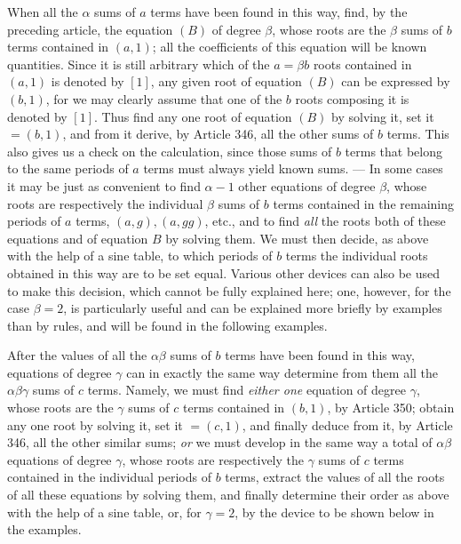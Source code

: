 When all the \(\alpha\) sums of \(a\) terms have been found in this way, find, by the preceding article, the equation \((B)\) of degree \(\beta\), whose roots are the \(\beta\) sums of \(b\) terms contained in \((a,1)\); all the coefficients of this equation will be known
quantities. Since it is still arbitrary which of the \(a=\beta b\) roots contained in \((a,1)\) is denoted by \([1]\), any given root of equation \((B)\) can be expressed by \((b,1)\), for we may clearly assume that one of the \(b\) roots composing it is denoted by \([1]\). Thus find any one root of equation \((B)\) by solving it, set it \(=(b,1)\), and from it derive, by Article 346, all the other sums of \(b\) terms. This also gives us a check on the calculation, since those sums of \(b\) terms that belong to the same periods of \(a\) terms must always yield known sums. — In some cases it may be just as convenient to find \(\alpha-1\) other equations of degree \(\beta\), whose roots are respectively the individual \(\beta\) sums of \(b\) terms contained in the remaining periods of \(a\) terms, \((a,g),\allowbreak (a,gg)\), etc., and to find \textit{all} the roots both of these equations and of equation \(B\) by solving them. We must then decide, as above with the help of a sine table, to which periods of \(b\) terms the individual roots obtained in this way are to be set equal. Various other devices can also be used to make this decision, which cannot be fully explained here; one, however, for the case \(\beta=2\), is particularly useful and can be explained more briefly by examples than by rules, and will be found in the following examples.

After the values of all the \(\alpha\beta\) sums of \(b\) terms have been found in this way, equations of degree \(\gamma\) can in exactly the same way determine from them all the \(\alpha\beta\gamma\) sums of \(c\) terms. Namely, we must find \textit{either one} equation of degree \(\gamma\), whose roots are the \(\gamma\) sums of \(c\) terms contained in \((b,1)\), by Article 350; obtain any one root by solving it, set it \(=(c,1)\), and finally deduce from it, by Article 346, all the other similar sums; \textit{or} we must develop in the same way a total of \(\alpha\beta\) equations of degree \(\gamma\), whose roots are respectively the \(\gamma\) sums of \(c\) terms contained in the individual periods of \(b\) terms, extract the values of all the roots of all these equations by solving them, and finally determine their order as above with the help of a sine table, or, for \(\gamma=2\), by the device to be shown below in the examples.

